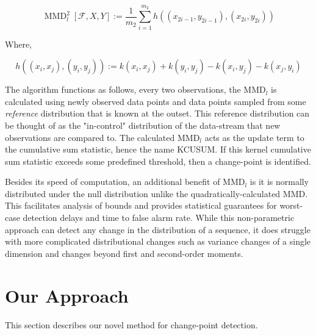 $$\operatorname{MMD}_{l}^{2}[\mathcal{F}, X, Y] :=\frac{1}{m_{2}} \sum_{i=1}^{m_{2}} h\left(\left(x_{2 i-1}, y_{2 i-1}\right),\left(x_{2 i}, y_{2 i}\right)\right)$$

Where,

$$h\left((x_i, x_j), (y_i, y_j)\right):=k\left(x_{i}, x_{j}\right)+k\left(y_{i}, y_{j}\right)-k\left(x_{i}, y_{j}\right)-k\left(x_{j}, y_{i}\right)$$

The algorithm functions as follows, every two observations, the MMD$_l$ is calculated using newly observed data points and data points sampled from some \textit{reference} distribution that is known at the outset. This reference distribution can be thought of as the "in-control" distribution of the data-stream that new observations are compared to. The calculated MMD$_l$ acts as the update term to the cumulative sum statistic, hence the name KCUSUM. If this kernel cumulative sum statistic exceeds some predefined threshold, then a change-point is identified. 

Besides its speed of computation, an additional benefit of MMD$_l$ is it is normally distributed under the null distribution unlike the quadratically-calculated MMD. This facilitates analysis of bounds and provides statistical guarantees for worst-case detection delays and time to false alarm rate. While this non-parametric approach can detect any change in the distribution of a sequence, it does struggle with more complicated distributional changes such as variance changes of a single dimension and changes beyond first and second-order moments.


\section{Our Approach}

This section describes our novel method for change-point detection.